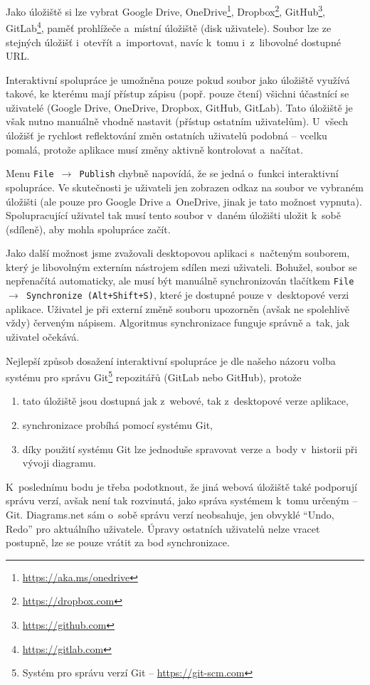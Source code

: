 Jako úložiště si lze vybrat Google Drive,
OneDrive\footnote{\url{https://aka.ms/onedrive}},
Dropbox\footnote{\url{https://dropbox.com}},
GitHub\footnote{\url{https://github.com}},
GitLab\footnote{\url{https://gitlab.com}}, paměť prohlížeče a~místní úložiště
(disk uživatele). Soubor lze ze stejných úložišť i~otevřít a~importovat, navíc
k~tomu i~z~libovolné dostupné URL.

Interaktivní spolupráce je umožněna pouze pokud soubor jako úložiště využívá
takové, ke kterému mají přístup zápisu (popř. pouze čtení) všichni účastnící se
uživatelé (Google Drive, OneDrive, Dropbox, GitHub, GitLab). Tato úložiště je
však nutno manuálně vhodně nastavit (přístup ostatním uživatelům). U~všech
úložišť je rychlost reflektování změn ostatních uživatelů podobná -- vcelku
pomalá, protože aplikace musí změny aktivně kontrolovat a~načítat.

Menu \texttt{File $\rightarrow$ Publish} chybně napovídá, že se jedná o~funkci
interaktivní spolupráce. Ve skutečnosti je uživateli jen zobrazen odkaz na
soubor ve vybraném úložišti (ale pouze pro Google Drive a~OneDrive, jinak je
tato možnost vypnuta). Spolupracující uživatel tak musí tento soubor v~daném
úložišti uložit k~sobě (sdíleně), aby mohla spolupráce začít.

Jako další možnost jsme zvažovali desktopovou aplikaci s~načteným souborem,
který je libovolným externím nástrojem sdílen mezi uživateli. Bohužel, soubor se
nepřenačítá automaticky, ale musí být manuálně synchronizován tlačítkem
\texttt{File $\rightarrow$ Synchronize (Alt+Shift+S)}, které je dostupné pouze
v~desktopové verzi aplikace. Uživatel je při externí změně souboru upozorněn
(avšak ne spolehlivě vždy) červeným nápisem. Algoritmus synchronizace funguje
správně a~tak, jak uživatel očekává.

Nejlepší způsob dosažení interaktivní spolupráce je dle našeho názoru volba
systému pro správu Git\footnote{Systém pro správu verzí Git --
\url{https://git-scm.com}} repozitářů (GitLab nebo GitHub), protože
\begin{enumerate}
  \item tato úložiště jsou dostupná jak z~webové, tak z~desktopové verze
  aplikace,
  \item synchronizace probíhá pomocí systému Git,
  \item díky použití systému Git lze jednoduše spravovat verze a~body v~historii
  při vývoji diagramu.
\end{enumerate} 

K~poslednímu bodu je třeba podotknout, že jiná webová úložiště také podporují
správu verzí, avšak není tak rozvinutá, jako správa systémem k~tomu určeným --
Git. Diagrams.net sám o~sobě správu verzí neobsahuje, jen obvyklé ``Undo, Redo''
pro aktuálního uživatele. Úpravy ostatních uživatelů nelze vracet postupně, lze
se pouze vrátit za bod synchronizace.

